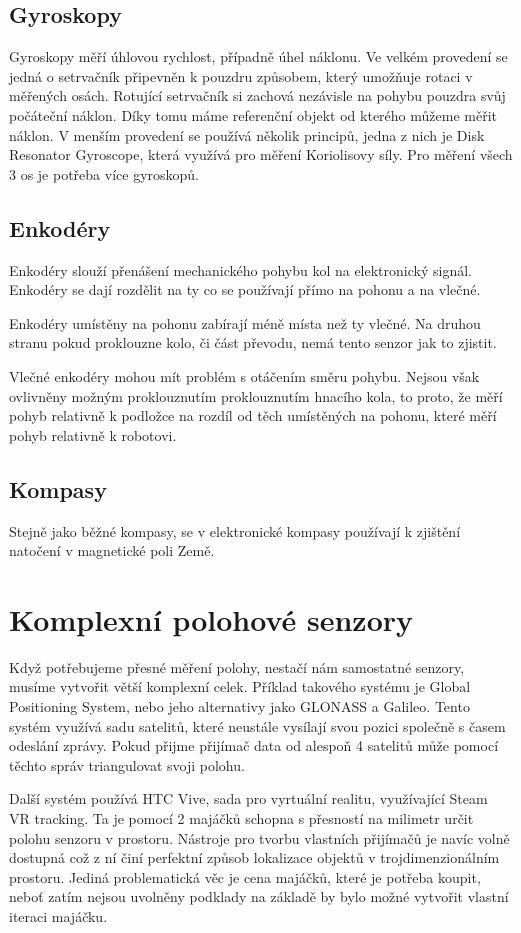 \subsection{Gyroskopy}
Gyroskopy měří úhlovou rychlost, případně úhel náklonu.
Ve velkém provedení se jedná o setrvačník připevněn k pouzdru způsobem, který umožňuje rotaci v měřených osách.
Rotující setrvačník si zachová nezávisle na pohybu pouzdra svůj počáteční náklon.
Díky tomu máme referenční objekt od kterého můžeme měřit náklon.
V menším provedení se používá několik principů, jedna z nich je Disk Resonator Gyroscope, která využívá pro měření Koriolisovy síly.
Pro měření všech 3 os je potřeba více gyroskopů.
\cite{gyro}
\cite{gyro-2}

\subsection{Enkodéry}
Enkodéry slouží přenášení mechanického pohybu kol na elektronický signál.
Enkodéry se dají rozdělit na ty co se používají přímo na pohonu a na vlečné.

Enkodéry umístěny na pohonu zabírají méně místa než ty vlečné. 
Na druhou stranu pokud proklouzne kolo, či část převodu, nemá tento senzor jak to zjistit.

Vlečné enkodéry mohou mít problém s otáčením směru pohybu.
Nejsou však ovlivněny možným proklouznutím proklouznutím hnacího kola, to proto, že měří pohyb relativně k podložce na rozdíl od těch umístěných na pohonu, které měří pohyb relativně k robotovi.


\subsection{Kompasy}
Stejně jako běžné kompasy, se v elektronické kompasy používají k zjištění natočení v magnetické poli Země.

\section{Komplexní polohové senzory}
Když potřebujeme přesné měření polohy, nestačí nám samostatné senzory, musíme vytvořit větší komplexní celek.
Příklad takového systému je Global Positioning System, nebo jeho alternativy jako GLONASS a Galileo.
Tento systém využívá sadu satelitů, které neustále vysílají svou pozici společně s časem odeslání zprávy.
Pokud přijme přijímač data od alespoň 4 satelitů může pomocí těchto správ triangulovat svoji polohu.

Další systém používá HTC Vive, sada pro vyrtuální realitu, využívající Steam VR tracking.
Ta je pomocí 2 majáčků schopna s přesností na milimetr určit polohu senzoru v prostoru.
Nástroje pro tvorbu vlastních přijímačů je navíc volně dostupná což z ní činí perfektní způsob lokalizace objektů v trojdimenzionálním prostoru.
Jediná problematická věc je cena majáčků, které je potřeba koupit, neboť zatím nejsou uvolněny podklady na základě by bylo možné vytvořit vlastní iteraci majáčku.

